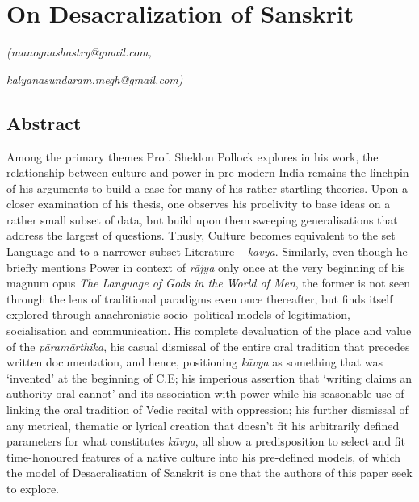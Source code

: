 
\chapter{On Desacralization of Sanskrit}\label{chapter8}


\begin{flushright}
\textit{\sf\em (manognashastry@gmail.com,}

\textit{\sf\em kalyanasundaram.megh@gmail.com)}
\end{flushright}


\section*{Abstract}

Among the primary themes Prof. Sheldon Pollock explores in his work, the relationship between culture and power in pre-modern India remains the linchpin of his arguments to build a case for many of his rather startling theories. Upon a closer examination of his thesis, one observes his proclivity to base ideas on a rather small subset of data, but build upon them sweeping generalisations that address the largest of questions. Thusly, Culture becomes equivalent to the set Language and to a narrower subset Literature – \textit{kāvya}. Similarly, even though he briefly mentions Power in context of \textit{rājya} only once at the very beginning of his magnum opus \textit{The Language of Gods in the World of Men}, the former is not seen through the lens of traditional paradigms even once thereafter, but finds itself explored through anachronistic socio–political models of legitimation, socialisation and communication. His complete devaluation of the place and value of the \textit{pāramārthika}, his casual dismissal of the entire oral tradition that precedes written documentation, and hence, positioning \textit{kāvya} as something that was ‘invented’ at the beginning of C.E; his imperious assertion that ‘writing claims an authority oral cannot’ and its association with power while his seasonable use of linking the oral tradition of Vedic recital with oppression; his further dismissal of any metrical, thematic or lyrical creation that doesn’t fit his arbitrarily defined parameters for what constitutes \textit{kāvya}, all show a predisposition to select and fit time-honoured features of a native culture into his pre-defined models, of which the model of Desacralisation of Sanskrit is one that the authors of this paper seek to explore.


